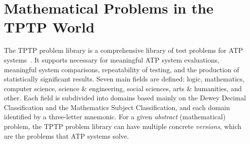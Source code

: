 \documentclass[runningheads]{llncs}
\begin{document}
\section{Mathematical Problems in the TPTP World}
\label{TPTP}

The TPTP problem library is a comprehensive library of test problems for ATP systems~\cite{Sut09}.
It supports necessary for meaningful ATP system evaluations, meaningful system comparisons, 
repeatability of testing, and the production of statistically significant results. 
Seven main fields are defined: logic, mathematics, computer science, science \& engineering, 
social sciences, arts \& humanities, and other. 
Each field is subdivided into domains based mainly on the Dewey Decimal Classification and the 
Mathematics Subject Classification, and each domain identified by a three-letter mnemonic.
For a given {\em abstract} (mathematical) problem, the TPTP problem library can have multiple 
concrete {\em versions}, which are the problems that ATP systems solve. 
\end{document}
